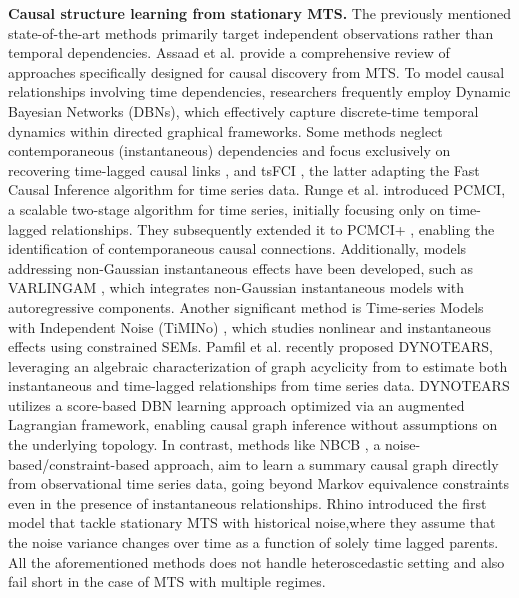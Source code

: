 \textbf{Causal structure learning from stationary MTS. }The previously mentioned state-of-the-art methods primarily target independent observations rather than temporal dependencies. Assaad et al. \citep{assaad2022survey} provide a comprehensive review of approaches specifically designed for causal discovery from MTS. To model causal relationships involving time dependencies, researchers frequently employ Dynamic Bayesian Networks (DBNs), which effectively capture discrete-time temporal dynamics within directed graphical frameworks. Some methods neglect contemporaneous (instantaneous) dependencies and focus exclusively on recovering time-lagged causal links \citep{haufe2010sparse,song2009time}, and tsFCI \citep{entner2010causal}, the latter adapting the Fast Causal Inference algorithm \citep{spirtes2000causation} for time series data. Runge et al. \citep{runge2019detecting} introduced PCMCI, a scalable two-stage algorithm for time series, initially focusing only on time-lagged relationships. They subsequently extended it to PCMCI+ \citep{runge2020discovering}, enabling the identification of contemporaneous causal connections. Additionally, models addressing non-Gaussian instantaneous effects have been developed, such as VARLINGAM \citep{hyvarinen2010estimation}, which integrates non-Gaussian instantaneous models with autoregressive components. Another significant method is Time-series Models with Independent Noise (TiMINo) \citep{peters2013causal}, which studies nonlinear and instantaneous effects using constrained SEMs. Pamfil et al. \citep{pamfil2020dynotears} recently proposed DYNOTEARS, leveraging an algebraic characterization of graph acyclicity from \citep{zheng2018dags} to estimate both instantaneous and time-lagged relationships from time series data. DYNOTEARS utilizes a score-based DBN learning approach optimized via an augmented Lagrangian framework, enabling causal graph inference without assumptions on the underlying topology. In contrast, methods like NBCB \citep{assaad2021mixed}, a noise-based/constraint-based approach, aim to learn a summary causal graph directly from observational time series data, going beyond Markov equivalence constraints even in the presence of instantaneous relationships. Rhino \citep{gong2022rhino} introduced the first model that tackle stationary MTS with historical noise,where they assume that the noise variance changes over time as a function of solely time lagged parents. All the aforementioned methods does not handle heteroscedastic setting and also fail short in the case of MTS with multiple regimes.


